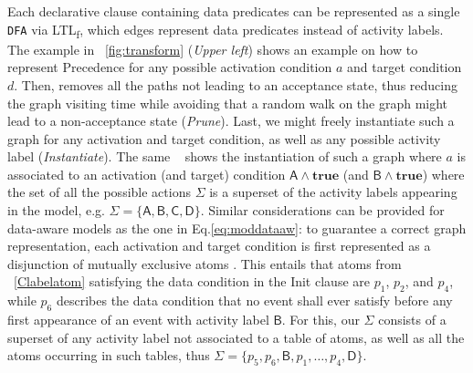 \documentclass[sigconf]{acmart}
\newcommand{\LTLf}{\textup{LTL}\textsubscript{f}\xspace}
\begin{document}
Each declarative clause containing data predicates can be represented as a single \texttt{DFA} via \LTLf \cite{FLLOAT1,ltlfnfa}, which edges represent data predicates instead of activity labels. The example in \figurename~\ref{fig:transform} (\textit{Upper left}) shows an example on how to represent \textsf{Precedence} for any possible activation condition $a$ and target condition $d$. Then, \cite{DBLP:conf/caise/CiccioBCM15} removes  all the paths not leading to an acceptance state, thus reducing the graph visiting time while avoiding that a random walk on the graph might lead to a non-acceptance state (\textit{Prune}). Last, we might freely instantiate such a graph for any activation and target condition, as well as any possible activity label \cite{DBLP:conf/bpm/BergamiMMM21} (\textit{Instantiate}). The same \figurename~ shows the instantiation of such a graph where $a$ is associated to an activation (and target) condition $\textsf{A}\wedge\mathbf{true}$ (and $\textsf{B}\wedge\mathbf{true}$) where the set of all the possible actions $\Sigma$ is a superset of the activity labels appearing in the model, e.g. $\Sigma=\{\textsf{A},\textsf{B},\textsf{C},\textsf{D}\}$. Similar considerations can be provided for data-aware models as the one in Eq.\ref{eq:moddataaw}:  to guarantee a correct graph representation,  each activation and target condition is first represented as a disjunction of mutually exclusive atoms %
 \cite{info14030173}. This entails that atoms from \figurename~\ref{Clabelatom} satisfying the data condition in the \textsf{Init} clause are $p_1$, $p_2$, and $p_4$, while $p_6$ describes the data condition that no event shall ever satisfy before any first appearance of an event with activity label $\textsf{B}$. For this, our %
$\Sigma$ 
consists of a superset of any activity label not associated to a table of atoms, as well as all the atoms occurring in such tables, thus $\Sigma=\{p_5,p_6,\textsf{B},p_1,\dots,p_4,\textsf{D}\}$.
%
%
 
\end{document}
